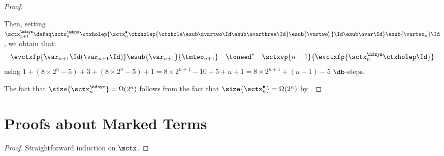 \begin{proof}
\begin{itemize}
      Then, setting
      $\sctx^{\ndsym}_{n+1} \defeq \sctx^{\ndsym}_n\ctxholep{\sctx^\bullet_n\ctxholep {\ctxhole \esub\avartwo\Id \esub\avarthree\Id}
      \esub{\vartwo_n'}\Id \esub\avar\Id}
      \esub{\vartwo_n}\Id$,
      we obtain that:
      \[\begin{array}{ccc}
      \evctxfp{\var_{n+1}\Id(\var_{n+1}\Id)} \esub{\var_{n+1}}{\tmtwo_{n+1}}
      &\toneed^* &\sctxvp{n+1}{\evctxfp{\sctx^{\ndsym}_n\ctxholep\Id}}
      \end{array}\]
      using
      $1 + (8 \times 2^n - 5) + 3 + (8 \times 2^n - 5) + 1
      = 8 \times 2^{n+1} - 10 + 5 +n + 1
      = 8 \times 2^{n+1} + (n + 1) - 5$ $\db$-steps.
  \end{itemize}
    The fact that $\size{\sctx_n^{\ndsym}} = \Omega(2^n)$ follows from the fact that $\size{\sctx_n^{\bullet}} = \Omega(2^n)$ by .\qedhere
\end{proof}


\section{Proofs about Marked Terms}

\begin{proof}
Straightforward induction on $\mctx$.
\end{proof}




